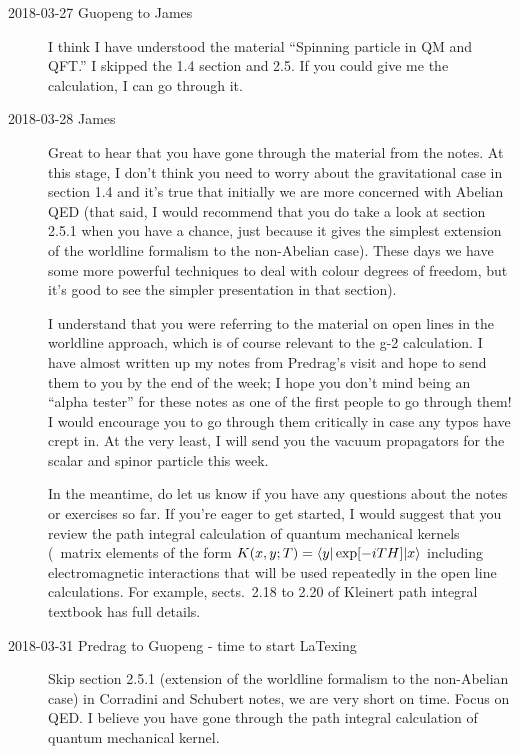 \begin{description}

\item[2018-03-27 Guopeng to James]
I think I have understood the material ``Spinning particle in QM and QFT.'' I
skipped the 1.4 section and 2.5. If you could give me the calculation,  I can
go through it.

\item[2018-03-28 James]
Great to hear that you have gone through the material from the notes. At this
stage, I don't think you need to worry about the gravitational case in section
1.4 and it's true that initially we are more concerned with Abelian QED (that
said, I would recommend that you do take a look at section 2.5.1 when you have
a chance, just because it gives the simplest extension of the worldline
formalism to the non-Abelian case). These days we have some more powerful
techniques to deal with colour degrees of freedom, but it's good to see the
simpler presentation in that section).

I understand that you were referring to the material on open lines in the
worldline approach, which is of course relevant to the g-2 calculation. I have
almost written up my notes from Predrag's visit and hope to send them to you by
the end of the week; I hope you don't mind being an ``alpha tester'' for these
notes as one of the first people to go through them! I would encourage you to
go through them critically in case any typos have crept in. At the very least,
I will send you the vacuum propagators for the scalar and spinor particle this
week.

In the meantime, do let us know if you have any questions about the notes or
exercises so far. If you're eager to get started, I would suggest that you
review the path integral calculation of quantum mechanical kernels (\ie\ matrix
elements of the form $K(x, y; T) = \bra{y} \exp[-i T H] \ket{x}$ including
electromagnetic interactions that will be used repeatedly in the open line
calculations. For example, sects.~2.18 to 2.20 of Kleinert path
integral textbook has full details.

\item[2018-03-31 Predrag to Guopeng - time to start LaTexing]
Skip section 2.5.1 (extension of the worldline formalism to the non-Abelian
case) in Corradini and Schubert notes, we are very short on time.
Focus on QED. I believe you have gone through the path integral calculation of
quantum mechanical kernel.


\end{description}
